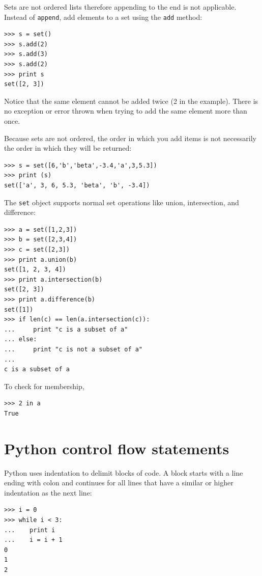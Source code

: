 \documentclass[justified,sixbynine]{tufte-book}
\def\ft{\small\tt}
\theoremstyle{plain}%
\theoremstyle{definition}
\theoremstyle{remark}
\begin{document}
\begin{fullwidth}
Sets are not ordered lists therefore appending to the end is not applicable.  Instead of {\ft append}, add elements to a set using the {\ft add} method:

\begin{lstlisting}
>>> s = set()
>>> s.add(2)
>>> s.add(3)
>>> s.add(2)
>>> print s
set([2, 3])
\end{lstlisting}

Notice that the same element cannot be added twice (2 in the example). There is no exception or error thrown when trying to add the same element more than once.

Because sets are not ordered, the order in which you add items is not necessarily the order in which they will be returned:

\begin{lstlisting}
>>> s = set([6,'b','beta',-3.4,'a',3,5.3])
>>> print (s)
set(['a', 3, 6, 5.3, 'beta', 'b', -3.4])
\end{lstlisting}


The {\ft set} object supports normal set operations like union, intersection, and difference:

\begin{lstlisting}
>>> a = set([1,2,3])
>>> b = set([2,3,4])
>>> c = set([2,3])
>>> print a.union(b)
set([1, 2, 3, 4])
>>> print a.intersection(b)
set([2, 3])
>>> print a.difference(b)
set([1])
>>> if len(c) == len(a.intersection(c)):
...     print "c is a subset of a"
... else:
...     print "c is not a subset of a"
...
c is a subset of a
\end{lstlisting}

To check for membership,

\begin{lstlisting}
>>> 2 in a
True
\end{lstlisting}

\goodbreak\section{Python control flow statements}

Python uses indentation to delimit blocks of code. A block starts with a line ending with colon and continues for all lines that have a similar or higher indentation as the next line:

\begin{lstlisting}
>>> i = 0
>>> while i < 3:
...    print i
...    i = i + 1
0
1
2
\end{lstlisting}


\end{fullwidth}
\end{document}
